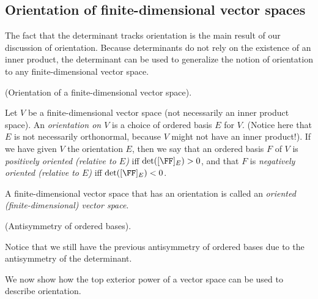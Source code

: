 \subsection*{Orientation of finite-dimensional vector spaces}

\label{ch::exterior_pwrs::orientation_finite_dim_vector_space}

The fact that the determinant tracks orientation is the main result of our discussion of orientation. Because determinants do not rely on the existence of an inner product, the determinant can be used to generalize the notion of orientation to any finite-dimensional vector space.

\begin{defn}
\label{ch::exterior_pwrs::defn::orientation_finite_dim_vector_space}
    (Orientation of a finite-dimensional vector space).
    
    Let $V$ be a finite-dimensional vector space (not necessarily an inner product space). An \textit{orientation on $V$} is a choice of ordered basis $E$ for $V$. (Notice here that $E$ is not necessarily orthonormal, because $V$ might not have an inner product!). If we have given $V$ the orientation $E$, then we say that an ordered basis $F$ of $V$ is \textit{positively oriented (relative to $E$)} iff $\det([\FF]_E) > 0$, and that $F$ is \textit{negatively oriented (relative to $E$)} iff $\det([\FF]_E) < 0$.
    
    A finite-dimensional vector space that has an orientation is called an \textit{oriented (finite-dimensional) vector space}.
\end{defn}
 
\begin{remark}
    (Antisymmetry of ordered bases).
    
    Notice that we still have the previous antisymmetry of ordered bases due to the antisymmetry of the determinant.
\end{remark}
 
We now show how the top exterior power of a vector space can be used to describe orientation. 


